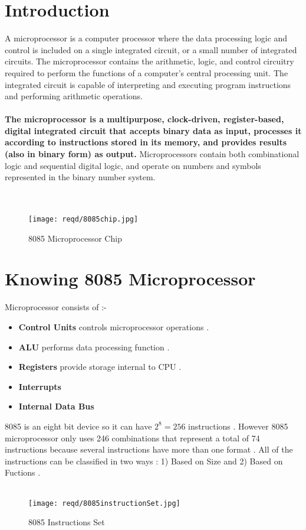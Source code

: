 \documentclass[14pt]{article}
\begin{document}
\section{Introduction}
A microprocessor is a computer processor where the data processing logic and control is included on a single integrated circuit, or a small number of integrated circuits. The microprocessor contains the arithmetic, logic, and control circuitry required to perform the functions of a computer's central processing unit. The integrated circuit is capable of interpreting and executing program instructions and performing arithmetic operations.\\ \\
\textbf{The microprocessor is a multipurpose, clock-driven, register-based, digital integrated circuit that accepts binary data as input, processes it according to instructions stored in its memory, and provides results (also in binary form) as output.} Microprocessors contain both combinational logic and sequential digital logic, and operate on numbers and symbols represented in the binary number system.\\ \\ \\
\begin{figure}[h]
	\centering
	\texttt{[image: reqd/8085chip.jpg]}
	\caption{8085 Microprocessor Chip}
\end{figure}



\section{Knowing 8085 Microprocessor}
Microprocessor consists of :-
\begin{itemize}
	\item{\textbf{Control Units}} controls microprocessor operations .
	\item{\textbf{ALU}} performs data processing function .
	\item{\textbf{Registers}} provide storage internal to CPU .
	\item{\textbf{Interrupts}}
	\item{\textbf{Internal Data Bus}} \\
\end{itemize}

8085 is an eight bit device so it can have $2^{8}=256$ instructions . However 8085 microprocessor only uses 246 combinations that represent a total of 74 instructions because several instructions have more than one format . All of the instructions can be classified in two ways : 1) Based on Size and 2) Based on Fuctions .\\\\
\begin{figure}[h]
	\centering
	\texttt{[image: reqd/8085instructionSet.jpg]}
	\caption{8085 Instructions Set}
\end{figure}
\vspace{2em}
\end{document}
